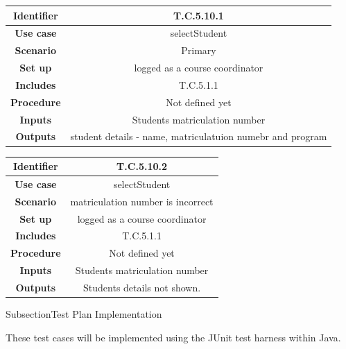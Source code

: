 \documentclass{l3deliverable}
\begin{document}
\begin{tabular}{|c|c|}
\hline \textbf{Identifier} & T.C.5.10.1\\
\hline \textbf{Use case} & selectStudent\\
\hline \textbf{Scenario} & Primary\\
\hline \textbf{Set up} & logged as a course coordinator\\
\hline \textbf{Includes} & T.C.5.1.1\\
\hline \textbf{Procedure} & Not defined yet\\
\hline \textbf{Inputs} & Students matriculation number\\
\hline \textbf{Outputs} & student details - name, matriculatuion numebr and program\\
\hline
\end{tabular}

\begin{tabular}{|c|c|}
\hline \textbf{Identifier} & T.C.5.10.2\\
\hline \textbf{Use case} & selectStudent\\
\hline \textbf{Scenario} & matriculation number is incorrect\\
\hline \textbf{Set up} & logged as a course coordinator\\
\hline \textbf{Includes} & T.C.5.1.1\\
\hline \textbf{Procedure} & Not defined yet\\
\hline \textbf{Inputs} & Students matriculation number\\
\hline \textbf{Outputs} & Students details not shown.\\
\hline
\end{tabular}

Subsection{Test Plan Implementation}

These test cases will be implemented using the JUnit test harness within Java. 
\end{document}
